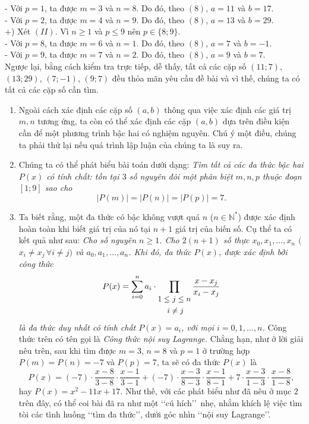 \begin{bt}
{\begin{itemize}
			- Với $p=1$, ta được $m=3$ và $n=8$. Do đó, theo $(8)$, $a=11$ và $b=17$.\\
			- Với $p=2$, ta được $m=4$ và $n=9$. Do đó, theo $(8)$, $a=13$ và $b=29$.\\
			+) Xét $(II)$. Vì $n\ge 1$ và $p\le 9$ nên $p\in\{8;9\}$.\\
			- Với $p=8$, ta được $m=6$ và $n=1$. Do đó, theo $(8)$, $a=7$ và $b=-1$.\\
			- Với $p=9$, ta được $m=7$ và $n=2$. Do đó, theo $(8)$, $a=9$ và $b=7$.\\
			Ngược lại, bằng cách kiểm tra trực tiếp, dễ thấy, tất cả các cặp số $(11;7)$, $(13;29)$, $(7;-1)$, $(9;7)$ đều thỏa mãn yêu cầu đề bài và vì thế, chúng ta có tất cả các cặp số cần tìm.
		\end{itemize}
		\begin{nx}
			\hfill
			\begin{enumerate}[1.]
				\item Ngoài cách xác định các cặp số $(a,b)$ thông qua việc xác định các giá trị $m,n$ tương ứng, ta còn có thể xác định các cặp $(a,b)$ dựa trên điều kiện cần để một phương trình bậc hai có nghiệm nguyên. Chú ý một điều, chúng ta phải thử lại nếu quá trình lập luận của chúng ta là suy ra.
				\item Chúng ta có thể phát biểu bài toán dưới dạng: {\em{Tìm tất cả các đa thức bậc hai $P(x)$ có tính chất: tồn tại $3$ số nguyên đôi một phân biệt $m,n,p$ thuộc đoạn $[1;9]$ sao cho
				$$|P(m)|=|P(n)|=|P(p)|=7.$$}}
				\item Ta biết rằng, một đa thức có bậc không vượt quá $n$ ($n\in\mathbb{N}^*$) được xác định hoàn toàn khi biết giá trị của nó tại $n+1$ giá trị của biến số. Cụ thể ta có kết quả như sau:
			{\em{Cho số nguyên $n\ge 1$. Cho $2(n+1)$ số thực $x_0,x_1,\dots,x_n$ $($$x_i\ne x_j\, \forall i\ne j$$)$ và $a_0,a_1,\dots,a_n$. Khi đó, đa thức $P(x)$, được xác định bởi công thức 
					$$P(x)=\sum\limits_{i=0}^{n}a_i\cdot\prod\limits_{\small\begin{aligned}1\le &\,\,j\le n\\ i&\ne j\end{aligned}}\dfrac{x-x_j}{x_i-x_j}$$
					là đa thức duy nhất có tính chất $P(x)=a_i$, với mọi $i=0,1,\dots,n$.}}
				Công thức trên có tên gọi là {\it Công thức nội suy Lagrange.}
				Chẳng hạn, như ở lời giải nêu trên, sau khi tìm được $m=3$, $n=8$ và $p=1$ ở trường hợp $P(m)=P(n)=-7$ và $P(p)=7$, ta sẽ có đa thức $P(x)$ là
				$$P(x)=(-7)\cdot\dfrac{x-8}{3-8}\cdot\dfrac{x-1}{3-1}+(-7)\cdot\dfrac{x-3}{8-3}\cdot\dfrac{x-1}{8-1}+7\cdot\dfrac{x-3}{1-3}\cdot\dfrac{x-8}{1-8},$$
				hay $P(x)=x^2-11x+17$. 
				Như thế, với các phát biểu như đã nêu ở mục 2 trên đây, có thể coi bài đã ra như một \lq\lq cú hích\rq\rq\, nhẹ, nhằm khích lệ việc tìm tòi các tình huống \lq\lq tìm đa thức\rq\rq, dưới góc nhìn \lq\lq nội suy Lagrange\rq\rq. 
			\end{enumerate}
		\end{nx}
	}
\end{bt}


